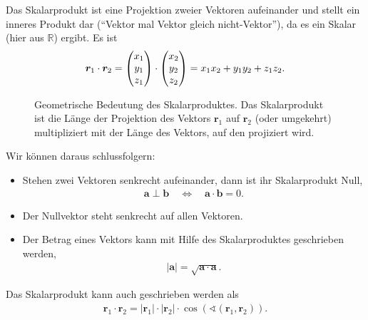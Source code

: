 Das Skalarprodukt ist eine Projektion zweier Vektoren aufeinander und stellt ein inneres Produkt dar (``Vektor mal Vektor gleich nicht-Vektor''), da es ein Skalar (hier aus $\mathbb{R}$) ergibt. Es ist 
\begin{align}
    \bm{r}_1 \cdot \bm{r}_2 = \mqty(x_1\\y_1\\z_1) \cdot \mqty(x_2\\y_2\\z_2) = x_1x_2 + y_1y_2+z_1z_2.
\end{align}
\begin{figure}[htp]
    \centering
    \caption{Geometrische Bedeutung des Skalarproduktes. Das Skalarprodukt ist die Länge der Projektion des Vektors $\bm{r}_1$ auf $\bm{r}_2$ (oder umgekehrt) multipliziert mit der Länge des Vektors, auf den projiziert wird.}
\end{figure}
Wir können daraus schlussfolgern: 
\begin{itemize}
    \item Stehen zwei Vektoren senkrecht aufeinander, dann ist ihr Skalarprodukt Null, 
    \begin{align}
        \bm{a} \perp \bm{b} \quad \Longleftrightarrow \quad \bm{a}\cdot \bm{b} = 0. 
    \end{align}
    \item Der Nullvektor steht senkrecht auf allen Vektoren. 
    \item Der Betrag eines Vektors kann mit Hilfe des Skalarproduktes geschrieben werden, 
    \begin{align}
        |\bm{a}| = \sqrt{\bm{a}\cdot\bm{a}}.
    \end{align}
\end{itemize}
Das Skalarprodukt kann auch geschrieben werden als 
\begin{align}
    \bm{r}_1 \cdot \bm{r}_2 = |\bm{r}_1|\cdot|\bm{r}_2| \cdot \cos(\sphericalangle (\bm{r}_1,\bm{r}_2)). 
\end{align}

